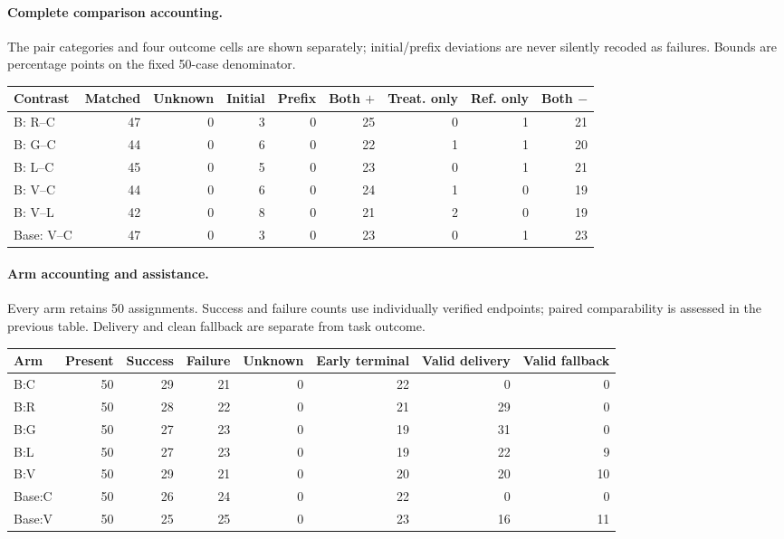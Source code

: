 \paragraph{Complete comparison accounting.} The pair categories and four outcome cells are shown separately; initial/prefix deviations are never silently recoded as failures. Bounds are percentage points on the fixed 50-case denominator.

\begin{tabular}{@{}lrrrrrrrr@{}}
\toprule
Contrast & Matched & Unknown & Initial & Prefix & Both $+$ & Treat. only & Ref. only & Both $-$\\
\midrule
B: R--C & 47 & 0 & 3 & 0 & 25 & 0 & 1 & 21\\
B: G--C & 44 & 0 & 6 & 0 & 22 & 1 & 1 & 20\\
B: L--C & 45 & 0 & 5 & 0 & 23 & 0 & 1 & 21\\
B: V--C & 44 & 0 & 6 & 0 & 24 & 1 & 0 & 19\\
B: V--L & 42 & 0 & 8 & 0 & 21 & 2 & 0 & 19\\
Base: V--C & 47 & 0 & 3 & 0 & 23 & 0 & 1 & 23\\
\bottomrule
\end{tabular}


\paragraph{Arm accounting and assistance.} Every arm retains 50 assignments. Success and failure counts use individually verified endpoints; paired comparability is assessed in the previous table. Delivery and clean fallback are separate from task outcome.

\begin{tabular}{@{}lrrrrrrr@{}}
\toprule
Arm & Present & Success & Failure & Unknown & Early terminal & Valid delivery & Valid fallback\\
\midrule
B:C & 50 & 29 & 21 & 0 & 22 & 0 & 0\\
B:R & 50 & 28 & 22 & 0 & 21 & 29 & 0\\
B:G & 50 & 27 & 23 & 0 & 19 & 31 & 0\\
B:L & 50 & 27 & 23 & 0 & 19 & 22 & 9\\
B:V & 50 & 29 & 21 & 0 & 20 & 20 & 10\\
Base:C & 50 & 26 & 24 & 0 & 22 & 0 & 0\\
Base:V & 50 & 25 & 25 & 0 & 23 & 16 & 11\\
\bottomrule
\end{tabular}


